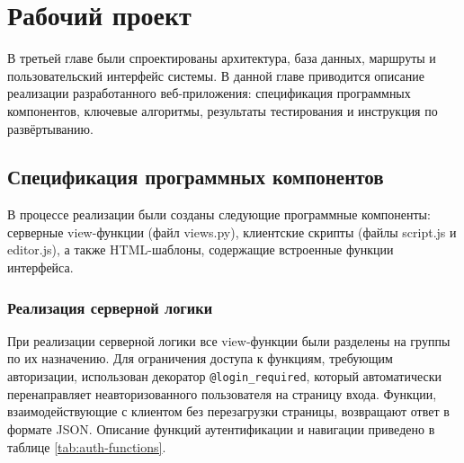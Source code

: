 \section{Рабочий проект}
В третьей главе были спроектированы архитектура, база данных, маршруты и пользовательский интерфейс системы. В данной главе приводится описание реализации разработанного веб-приложения: спецификация программных компонентов, ключевые алгоритмы, результаты тестирования и инструкция по развёртыванию.

\subsection{Спецификация программных компонентов}

В процессе реализации были созданы следующие программные компоненты: серверные view-функции (файл views.py), клиентские скрипты (файлы script.js и editor.js), а также HTML-шаблоны, содержащие встроенные функции интерфейса.

\subsubsection{Реализация серверной логики}

При реализации серверной логики все view-функции были разделены на группы по их назначению. Для ограничения доступа к функциям, требующим авторизации, использован декоратор \texttt{@login\_required}, который автоматически перенаправляет неавторизованного пользователя на страницу входа. Функции, взаимодействующие с клиентом без перезагрузки страницы, возвращают ответ в формате JSON. Описание функций аутентификации и навигации приведено в таблице \ref{tab:auth-functions}.

